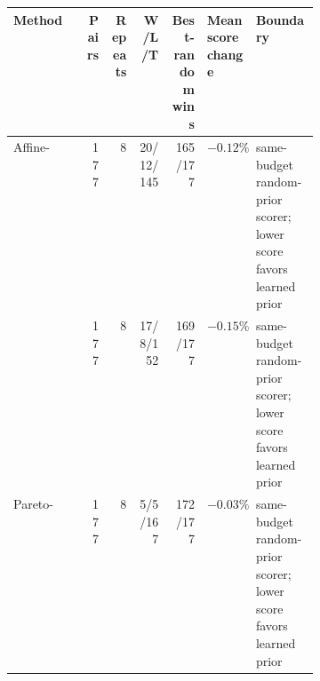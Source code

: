 \begin{tabularx}{\linewidth}{>{\raggedright\arraybackslash}p{0.24\linewidth}rrrr>{\raggedleft\arraybackslash}p{0.16\linewidth}>{\raggedright\arraybackslash}X}
\toprule
Method & Pairs & Repeats & W/L/T & Best-random wins & Mean score change & Boundary \\
\midrule
Affine-\method{} & 177 & 8 & 20/12/145 & 165/177 & $-0.12\%$ & same-budget random-prior scorer; lower score favors learned prior \\
\method{} & 177 & 8 & 17/8/152 & 169/177 & $-0.15\%$ & same-budget random-prior scorer; lower score favors learned prior \\
Pareto-\method{} & 177 & 8 & 5/5/167 & 172/177 & $-0.03\%$ & same-budget random-prior scorer; lower score favors learned prior \\
\bottomrule
\end{tabularx}
